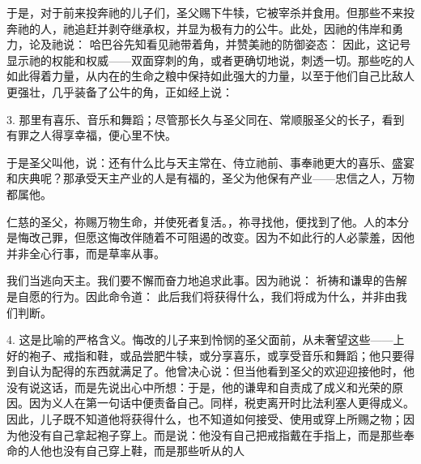 于是，对于前来投奔祂的儿子们，圣父赐下牛犊，它被宰杀并食用。但那些不来投奔祂的人，祂追赶并剥夺继承权，并显为极有力的公牛。此处，因祂的伟岸和勇力，论及祂说： 哈巴谷先知看见祂带着角，并赞美祂的防御姿态： 因此，这记号显示祂的权能和权威——双面穿刺的角，或者更确切地说，刺透一切。那些吃的人如此得着力量，从内在的生命之粮中保持如此强大的力量，以至于他们自己比敌人更强壮，几乎装备了公牛的角，正如经上说：\par

3. 那里有喜乐、音乐和舞蹈；尽管那长久与圣父同在、常顺服圣父的长子，看到有罪之人得享幸福，便心里不快。\par

于是圣父叫他，说：还有什么比与天主常在、侍立祂前、事奉祂更大的喜乐、盛宴和庆典呢？那承受天主产业的人是有福的，圣父为他保有产业——忠信之人，万物都属他。\par

仁慈的圣父，祢赐万物生命，并使死者复活。，祢寻找他，便找到了他。人的本分是悔改己罪，但愿这悔改伴随着不可阻遏的改变。因为不如此行的人必蒙羞，因他并非全心行事，而是草率从事。\par

我们当逃向天主。我们要不懈而奋力地追求此事。因为祂说： 祈祷和谦卑的告解是自愿的行为。因此命令道： 此后我们将获得什么，我们将成为什么，并非由我们判断。\par

4. 这是比喻的严格含义。悔改的儿子来到怜悯的圣父面前，从未奢望这些——上好的袍子、戒指和鞋，或品尝肥牛犊，或分享喜乐，或享受音乐和舞蹈；他只要得到自认为配得的东西就满足了。他曾决心说：但当他看到圣父的欢迎迎接他时，他没有说这话，而是先说出心中所想：于是，他的谦卑和自责成了成义和光荣的原因。因为义人在第一句话中便责备自己。同样，税吏离开时比法利塞人更得成义。因此，儿子既不知道他将获得什么，也不知道如何接受、使用或穿上所赐之物；因为他没有自己拿起袍子穿上。而是说：他没有自己把戒指戴在手指上，而是那些奉命的人他也没有自己穿上鞋，而是那些听从的人\par

